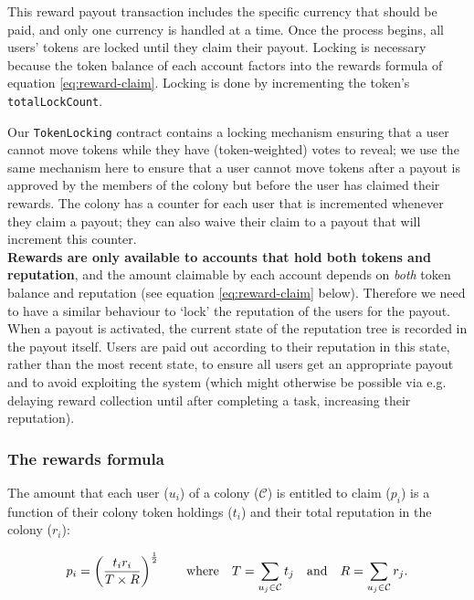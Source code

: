 This reward payout transaction includes the specific currency that should be paid, and only one currency is handled at a time. Once the process begins, all users' tokens are locked until they claim their payout. Locking is necessary because the token balance of each account factors into the rewards formula of equation \eqref{eq:reward-claim}. Locking is done by incrementing the token's \texttt{totalLockCount}.

Our \texttt{TokenLocking} contract contains a locking mechanism ensuring that a user cannot move tokens while they have (token-weighted) votes to reveal; we use the same mechanism here to ensure that a user cannot move tokens after a payout is approved by the members of the colony but before the user has claimed their rewards. The colony has a counter for each user that is incremented whenever they claim a payout; they can also waive their claim to a payout that will increment this counter. \\

\textbf{Rewards are only available to accounts that hold both tokens and reputation}, and the amount claimable by each account depends on \emph{both} token balance and reputation (see equation \eqref{eq:reward-claim} below). Therefore we need to have a similar behaviour to `lock' the reputation of the users for the payout. When a payout is activated, the current state of the reputation tree is recorded in the payout itself. Users are paid out according to their reputation in this state, rather than the most recent state, to ensure all users get an appropriate payout and to avoid exploiting the system (which might otherwise be possible via e.g. delaying reward collection until after completing a task, increasing their reputation).

\subsubsection{The rewards formula}

The amount that each user ($u_i$) of a colony ($\mathcal{C}$) is entitled to claim ($p_i$) is a function of their colony token holdings ($t_i$) and their total reputation in the colony ($r_i$):

\begin{equation}\label{eq:reward-claim}
 p_i = \left(\frac{t_i r_i}{T \times R}\right)^{\frac{1}{2}} \qquad \textnormal{where} \quad T = \sum\limits_{u_j\in \mathcal{C}} t_j \quad\textnormal{and}\quad R = \sum\limits_{u_j\in \mathcal{C}} r_j.
\end{equation}

